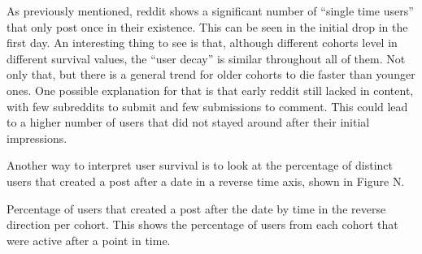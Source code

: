 As previously mentioned, reddit shows a significant number of ``single time users'' that only post once in their existence. This can be seen in the initial drop in the first day. An interesting thing to see is that, although different cohorts level in different survival values, the ``user decay'' is similar throughout all of them. Not only that, but there is a general trend for older cohorts to die faster than younger ones. One possible explanation for that is that early reddit still lacked in content, with few subreddits to submit and few submissions to comment. This could lead to a higher number of users that did not stayed around after their initial impressions. 

Another way to interpret user survival is to look at the percentage of distinct users that created a post after a date in a reverse time axis, shown in Figure N. 

Percentage of users that created a post after the date by time in the reverse direction per cohort. This shows the percentage of users from each cohort that were active after a point in time.

